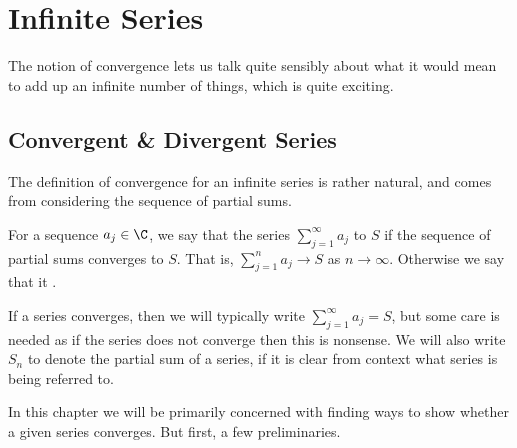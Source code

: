 \documentclass[a4paper]{scrartcl}
\begin{document}

	

\clearpage
\section{Infinite Series}\label{sec:2}

The notion of convergence lets us talk quite sensibly about what it would mean to add up an infinite number of things, which is quite exciting. 

\subsection{Convergent \& Divergent Series}

The definition of convergence for an infinite series is rather natural, and comes from considering the sequence of partial sums.


\begin{definition}
		For a sequence $a_j \in \C$, we say that the series $\sum_{j = 1}^{\infty} a_j$  to $S$ if the sequence of partial sums converges to $S$.
		That is, $\sum_{j = 1}^{n} a_j \rightarrow S$ as $n \rightarrow \infty$. Otherwise we say that it .
	\end{definition}

	\begin{remark}[Notation]
		If a series converges, then we will typically write $\sum_{j = 1}^{\infty} a_j = S$, but some care is needed as if the series does not converge then this is nonsense. 
		We will also write $S_n$ to denote the partial sum of a series, if it is clear from context what series is being referred to.
	\end{remark}

In this chapter we will be primarily concerned with finding ways to show whether a given series converges. But first, a few preliminaries.
\end{document}
